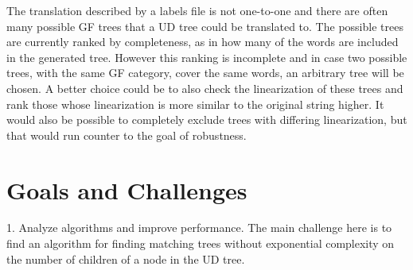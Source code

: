 \documentclass{article}
\begin{document}
The translation described by a labels file is not one-to-one and there are often many possible GF trees that a UD tree could be translated to. The possible trees are currently ranked by completeness, as in how many of the words are included in the generated tree. However this ranking is incomplete and in case two possible trees, with the same GF category, cover the same words, an arbitrary tree will be chosen. A better choice could be to also check the linearization of these trees and rank those whose linearization is more similar to the original string higher. It would also be possible to completely exclude trees with differing linearization, but that would run counter to the goal of robustness.







\section{Goals and Challenges}




1. Analyze algorithms and improve performance. The main challenge here is to find an algorithm for finding matching trees without exponential complexity on the number of children of a node in the UD tree.
\end{document}
